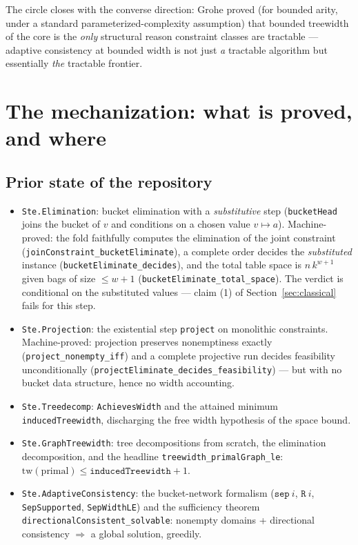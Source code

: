 \documentclass[11pt]{article}
\newcommand{\ste}[1]{\texttt{#1}}
\begin{document}
The circle closes with the converse direction: Grohe proved (for
bounded arity, under a standard parameterized-complexity assumption)
that bounded treewidth of the core is the \emph{only} structural reason
constraint classes are tractable \citep{grohe2007complexity} ---
adaptive consistency at bounded width is not just \emph{a} tractable
algorithm but essentially \emph{the} tractable frontier.

\section{The mechanization: what is proved, and where}
\label{sec:mech}

\subsection{Prior state of the repository}

\begin{itemize}
\item \ste{Ste.Elimination}: bucket elimination with a
  \emph{substitutive} step (\ste{bucketHead} joins the bucket of $v$
  and conditions on a chosen value $v \mapsto a$).
  Machine-proved: the fold faithfully computes the elimination of the
  joint constraint (\ste{joinConstraint\_bucketEliminate}), a complete
  order decides the \emph{substituted} instance
  (\ste{bucketEliminate\_decides}), and the total table space is
  $n\,k^{w+1}$ given bags of size $\le w{+}1$
  (\ste{bucketEliminate\_total\_space}). The verdict is conditional on
  the substituted values --- claim (1) of
  Section~\ref{sec:classical} fails for this step.
\item \ste{Ste.Projection}: the existential step \ste{project} on
  monolithic constraints. Machine-proved: projection preserves
  nonemptiness exactly (\ste{project\_nonempty\_iff}) and a complete
  projective run decides feasibility unconditionally
  (\ste{projectEliminate\_decides\_feasibility}) --- but with no bucket
  data structure, hence no width accounting.
\item \ste{Ste.Treedecomp}: \ste{AchievesWidth} and the attained
  minimum \ste{inducedTreewidth}, discharging the free width
  hypothesis of the space bound.
\item \ste{Ste.GraphTreewidth}: tree decompositions from scratch, the
  elimination decomposition, and the headline
  \ste{treewidth\_primalGraph\_le}:
  $\mathrm{tw}(\text{primal}) \le \ste{inducedTreewidth} + 1$.
\item \ste{Ste.AdaptiveConsistency}: the bucket-network formalism
  ($\ste{sep}\ i$, $\ste{R}\ i$, \ste{SepSupported},
  \ste{SepWidthLE}) and the sufficiency theorem
  \ste{directionalConsistent\_solvable}: nonempty domains +
  directional consistency $\Rightarrow$ a global solution, greedily.
\end{itemize}
\end{document}
